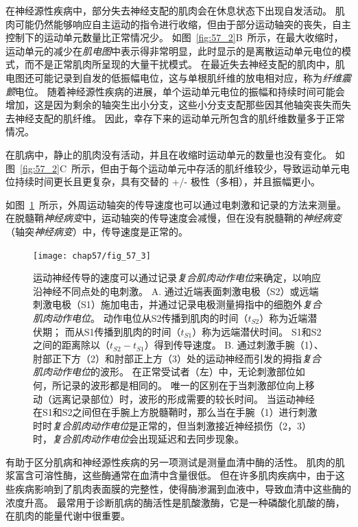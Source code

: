 在神经源性疾病中，部分失去神经支配的肌肉会在休息状态下出现自发活动。
肌肉可能仍然能够响应自主运动的指令进行收缩，但由于部分运动轴突的丧失，自主控制下的运动单元数量比正常情况少。
如图~\ref{fig:57_2}B~所示，在最大收缩时，运动单元的减少在\textit{肌电图}中表示得非常明显，此时显示的是离散运动单元电位的模式，而不是正常肌肉所呈现的大量干扰模式。
在最近失去神经支配的肌肉中，肌电图还可能记录到自发的低振幅电位，这与单根肌纤维的放电相对应，称为\textit{纤维震颤}电位。
随着神经源性疾病的进展，单个运动单元电位的振幅和持续时间可能会增加，这是因为剩余的轴突生出小分支，这些小分支支配那些因其他轴突丧失而失去神经支配的肌纤维。
因此，幸存下来的运动单元所包含的肌纤维数量多于正常情况。


在肌病中，静止的肌肉没有活动，并且在收缩时运动单元的数量也没有变化。
如图~\ref{fig:57_2}C~所示，但由于每个运动单元中存活的肌纤维较少，导致运动单元电位持续时间更长且更复杂，具有交替的 +/- 极性（多相），并且振幅更小。


如图~\ref{fig:57_3}~所示，外周运动轴突的传导速度也可以通过电刺激和记录的方法来测量。
在脱髓鞘\textit{神经病变}中，运动轴突的传导速度会减慢，但在没有脱髓鞘的\textit{神经病变}（轴突\textit{神经病变}）中，传导速度是正常的。


\begin{figure}[htbp]
	\centering
	\texttt{[image: chap57/fig\_57\_3]}
	\caption{运动神经传导的速度可以通过记录\textit{复合肌肉动作电位}来确定，以响应沿神经不同点处的电刺激。
		A. 通过近端表面刺激电极（S2）或远端刺激电极（S1）施加电击，并通过记录电极测量拇指中的细胞外\textit{复合肌肉动作电位}。
		动作电位从S2传播到肌肉的时间（$ t_{S2} $）称为近端潜伏期；
		而从S1传播到肌肉的时间（$ t_{S1} $）称为远端潜伏时间。
		S1和S2之间的距离除以（$ t_{S2} - t_{S1} $）得到传导速度。
		B. 通过刺激手腕（1）、肘部正下方（2）和肘部正上方（3）处的运动神经而引发的拇指\textit{复合肌肉动作电位}的波形。
		在正常受试者（左）中，无论刺激部位如何，所记录的波形都是相同的。
		唯一的区别在于当刺激部位向上移动（远离记录部位）时，波形的形成需要的较长时间。
		当运动神经在S1和S2之间但在手腕上方脱髓鞘时，那么当在手腕（1）进行刺激时时\textit{复合肌肉动作电位}是正常的，但当刺激接近神经损伤（2，3）时，\textit{复合肌肉动作电位}会出现延迟和去同步现象\cite{bromberg2002acute}。}
	\label{fig:57_3}
\end{figure}


有助于区分肌病和神经源性疾病的另一项测试是测量血清中酶的活性。
肌肉的肌浆富含可溶性酶，这些酶通常在血清中含量很低。
但在许多肌肉疾病中，由于这些疾病影响到了肌肉表面膜的完整性，使得酶渗漏到血液中，导致血清中这些酶的浓度升高。
最常用于诊断肌病的酶活性是肌酸激酶，它是一种磷酸化肌酸的酶，在肌肉的能量代谢中很重要。


